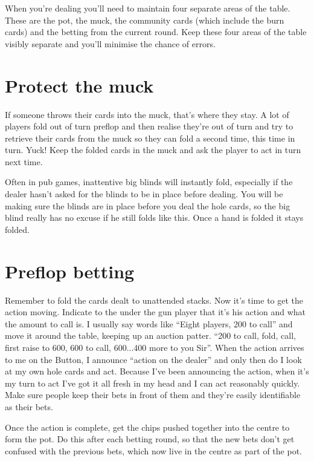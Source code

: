 When you're dealing you'll need to maintain four separate areas of the table.
These are the pot, the muck, the community cards (which include the burn cards)
and the betting from the current round. Keep these four areas of the table
visibly separate and you'll minimise the chance of errors.

\section{Protect the muck}

If someone throws their cards into the muck, that's where they stay.
A lot of players fold out of turn preflop and then realise
they're out of turn and try to retrieve their cards from the muck
so they can fold a second time, this time in turn. Yuck! Keep the
folded cards in the muck and ask the player to act in turn next time.

Often in pub games, inattentive big blinds will instantly fold,
especially if the dealer hasn't asked for the blinds to be in place
before dealing. You will be making sure the blinds are in place before
you deal the hole cards, so the big blind really has no excuse
if he still folds like this. Once a hand is folded it stays folded.

\section{Preflop betting}

Remember to fold the cards dealt to unattended stacks.
Now it's time to get the action moving. Indicate to the under the gun
player that it's his action and what the amount to call is. I usually
say words like ``Eight players, 200 to call'' and move it around
the table, keeping up an auction patter. ``200 to call, fold, call,
first raise to 600, 600 to call, 600...400 more to you Sir''. When the
action arrives to me on the Button, I announce ``action on the dealer''
and only then do I look at my own hole cards and act. Because I've
been announcing the action, when it's my turn to act I've got it all
fresh in my head and I can act reasonably quickly. Make sure people
keep their bets in front of them and they're easily identifiable as their
bets.


Once the action is complete, get the chips pushed together into the
centre to form the pot. Do this after each betting round, so that the
new bets don't get confused with the previous bets, which now live
in the centre as part of the pot.

